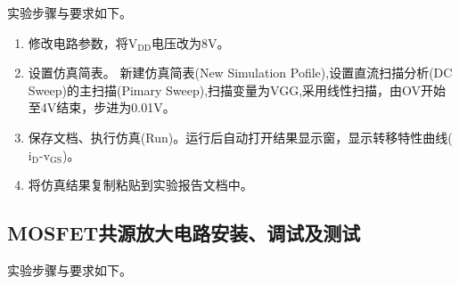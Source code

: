 \documentclass[a4paper]{article}
\theoremstyle{definition}
\theoremstyle{plain}
\theoremstyle{remark}
\begin{document}
实验步骤与要求如下。
\begin{enumerate}
	\item 修改电路参数，将$\mathrm{V_{DD}}$电压改为8V。
	\item 设置仿真简表。
	      新建仿真简表(New Simulation Pofile),设置直流扫描分析(DC Sweep)的主扫描(Pimary Sweep),扫描变量为VGG,采用线性扫描，由OV开始至4V结束，步进为0.01V。
	\item 保存文档、执行仿真(Run)。运行后自动打开结果显示窗，显示转移特性曲线($\mathrm{i_D}$-$\mathrm{v_{GS}}$)。
	\item 将仿真结果复制粘贴到实验报告文档中。
\end{enumerate}

\subsection{MOSFET共源放大电路安装、调试及测试}
实验步骤与要求如下。
\end{document}
